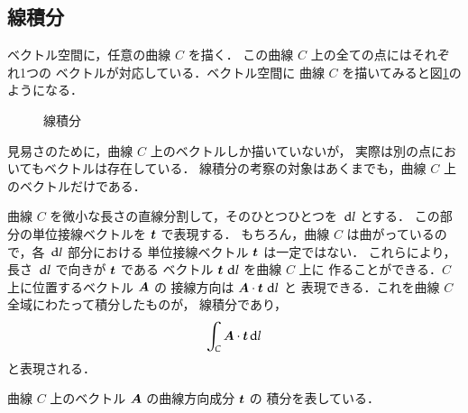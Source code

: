  \subsection{線積分}
    ベクトル空間に，任意の曲線 $C$ を描く．
    この曲線 $C$ 上の全ての点にはそれぞれ1つの
    ベクトルが対応している．ベクトル空間に
    曲線 $C$ を描いてみると図\ref{fig:sensekibun}のようになる．
                \begin{figure}[hbt]
                    \begin{center}
                        \caption{線積分}
                        \label{fig:sensekibun}
                    \end{center}
                \end{figure}


    見易さのために，曲線 $C$ 上のベクトルしか描いていないが，
    実際は別の点においてもベクトルは存在している．
    線積分の考察の対象はあくまでも，曲線 $C$ 上のベクトルだけである．

    曲線 $C$ を微小な長さの直線分割して，そのひとつひとつを $\,\mathrm{d} l$ とする．
    この部分の単位接線ベクトルを $\boldsymbol{t}$ で表現する．
    もちろん，曲線 $C$ は曲がっているので，各 $\,\mathrm{d} l$ 部分における
    単位接線ベクトル $\boldsymbol{t}$ は一定ではない．
    これらにより，長さ $\,\mathrm{d} l$ で向きが $\boldsymbol{t}$ である
    ベクトル $\boldsymbol{t}\,\,\mathrm{d} l$ を曲線 $C$ 上に
    作ることができる．$C$ 上に位置するベクトル $\boldsymbol{A}$ の
    接線方向は  $\boldsymbol{A}\cdot\boldsymbol{t}\,\,\mathrm{d} l$ と
    表現できる．これを曲線 $C$ 全域にわたって積分したものが，
    線積分であり，
        \begin{align}
        \int_{C} \boldsymbol{A}\cdot \boldsymbol{t}\,\mathrm{d} l
        \end{align}
    と表現される．

    曲線 $C$ 上のベクトル $\boldsymbol{A}$ の曲線方向成分 $\boldsymbol{t}$ の
    積分を表している．


